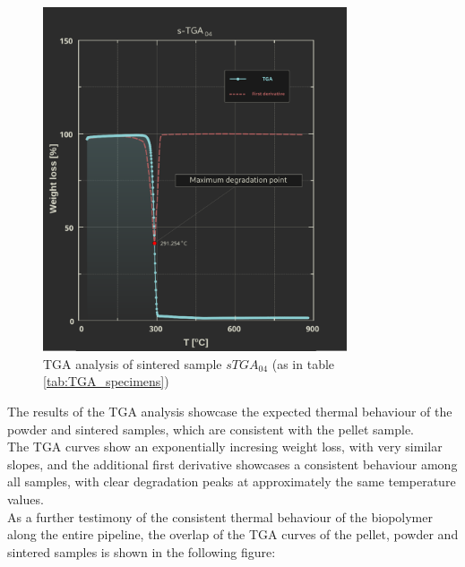\documentclass{article}
\begin{document}
            \begin{figure}[h!]
                \centering
                \includegraphics[width=0.8\textwidth]{Pictures/Thermal_analysis_plots/TGA_catalogued/Fixed/s-TGA04.pdf}
                \caption{TGA analysis of sintered sample $sTGA_{04}$ (as in table \ref{tab:TGA_specimens})}
                \label{fig:TGA_04}
            \end{figure}

            \clearpage

            The results of the TGA analysis showcase the expected thermal behaviour of the powder and sintered samples,
            which are consistent with the pellet sample. \\ 

            The TGA curves show an exponentially incresing weight loss, with very similar slopes, and the additional 
            first derivative showcases a consistent behaviour among all samples, with clear degradation peaks at approximately 
            the same temperature values. \\ 

            As a further testimony of the consistent thermal behaviour of the biopolymer along the entire pipeline, the overlap of the
            TGA curves of the pellet, powder and sintered samples is shown in the following figure:
\end{document}
